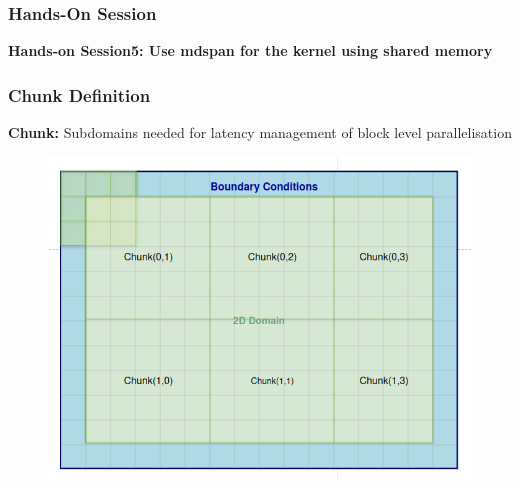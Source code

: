 \documentclass[9pt]{beamer}
\begin{document}
\begin{frame}
\frametitle{Hands-On Session}
\begin{center}
      \Huge \textbf{Hands-on Session5: Use mdspan for the kernel using shared memory}
  \end{center}
\end{frame}
%
\begin{frame}
\frametitle{Chunk Definition}
\textbf{Chunk:} Subdomains needed for latency management of block level parallelisation
\vspace{-0.5\baselineskip}
\begin{figure}
    \centering
    \includegraphics[height=0.78\textheight]{Screenshot from 2024-09-02 14-11-22.png}
    \label{fig:enter-label}
\end{figure}
\end{frame}
\end{document}
